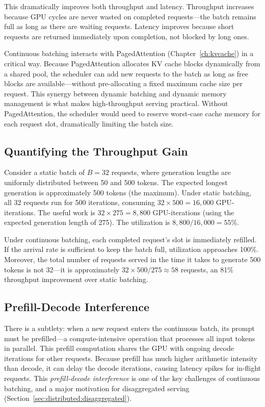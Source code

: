 This dramatically improves both throughput and latency. Throughput increases because GPU cycles are never wasted on completed requests---the batch remains full as long as there are waiting requests. Latency improves because short requests are returned immediately upon completion, not blocked by long ones.

\begin{notebox}
Continuous batching interacts with PagedAttention (Chapter~\ref{ch:kvcache}) in a critical way. Because PagedAttention allocates KV cache blocks dynamically from a shared pool, the scheduler can add new requests to the batch as long as free blocks are available---without pre-allocating a fixed maximum cache size per request. This synergy between dynamic batching and dynamic memory management is what makes high-throughput serving practical. Without PagedAttention, the scheduler would need to reserve worst-case cache memory for each request slot, dramatically limiting the batch size.
\end{notebox}

\subsection{Quantifying the Throughput Gain}

Consider a static batch of $B = 32$ requests, where generation lengths are uniformly distributed between 50 and 500 tokens. The expected longest generation is approximately 500 tokens (the maximum). Under static batching, all 32 requests run for 500 iterations, consuming $32 \times 500 = 16{,}000$ GPU-iterations. The useful work is $32 \times 275 = 8{,}800$ GPU-iterations (using the expected generation length of 275). The utilization is $8{,}800 / 16{,}000 = 55\%$.

Under continuous batching, each completed request's slot is immediately refilled. If the arrival rate is sufficient to keep the batch full, utilization approaches 100\%. Moreover, the total number of requests served in the time it takes to generate 500 tokens is not 32---it is approximately $32 \times 500 / 275 \approx 58$ requests, an 81\% throughput improvement over static batching.

\subsection{Prefill-Decode Interference}

%
There is a subtlety: when a new request enters the continuous batch, its prompt must be prefilled---a compute-intensive operation that processes all input tokens in parallel. This prefill computation shares the GPU with ongoing decode iterations for other requests. Because prefill has much higher arithmetic intensity than decode, it can delay the decode iterations, causing latency spikes for in-flight requests. This \emph{prefill-decode interference} is one of the key challenges of continuous batching, and a major motivation for disaggregated serving (Section~\ref{sec:distributed:disaggregated}).

